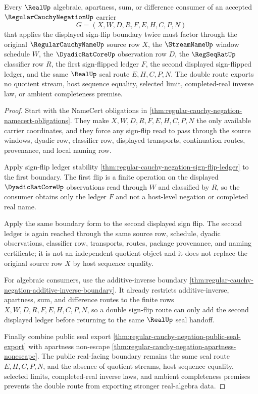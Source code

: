 \begin{theorem}
\label{thm:regular-cauchy-negation-involutive-seal-boundary}
Every $\RealUp$ algebraic, apartness, sum, or difference consumer of an accepted $\RegularCauchyNegationUp$ carrier
$$
G=(X,W,D,R,F,E,H,C,P,N)
$$
that applies the displayed sign-flip boundary twice must factor through the original $\RegularCauchyNameUp$ source row $X$, the $\StreamNameUp$ window schedule $W$, the $\DyadicRatCoreUp$ observation row $D$, the $\RegSeqRatUp$ classifier row $R$, the first sign-flipped ledger $F$, the second displayed sign-flipped ledger, and the same $\RealUp$ seal route $E,H,C,P,N$. The double route exports no quotient stream, host sequence equality, selected limit, completed-real inverse law, or ambient completeness premise.
\end{theorem}
\begin{proof}
Start with the NameCert obligations in \autoref{thm:regular-cauchy-negation-namecert-obligations}. They make $X,W,D,R,F,E,H,C,P,N$ the only available carrier coordinates, and they force any sign-flip read to pass through the source windows, dyadic row, classifier row, displayed transports, continuation routes, provenance, and local naming row.

Apply sign-flip ledger stability \autoref{thm:regular-cauchy-negation-sign-flip-ledger} to the first boundary. The first flip is a finite operation on the displayed $\DyadicRatCoreUp$ observations read through $W$ and classified by $R$, so the consumer obtains only the ledger $F$ and not a host-level negation or completed real name.

Apply the same boundary form to the second displayed sign flip. The second ledger is again reached through the same source row, schedule, dyadic observations, classifier row, transports, routes, package provenance, and naming certificate; it is not an independent quotient object and it does not replace the original source row $X$ by host sequence equality.

For algebraic consumers, use the additive-inverse boundary \autoref{thm:regular-cauchy-negation-additive-inverse-boundary}. It already restricts additive-inverse, apartness, sum, and difference routes to the finite rows $X,W,D,R,F,E,H,C,P,N$, so a double sign-flip route can only add the second displayed ledger before returning to the same $\RealUp$ seal handoff.

Finally combine public seal export \autoref{thm:regular-cauchy-negation-public-seal-export} with apartness non-escape \autoref{thm:regular-cauchy-negation-apartness-nonescape}. The public real-facing boundary remains the same seal route $E,H,C,P,N$, and the absence of quotient streams, host sequence equality, selected limits, completed-real inverse laws, and ambient completeness premises prevents the double route from exporting stronger real-algebra data.
\end{proof}

